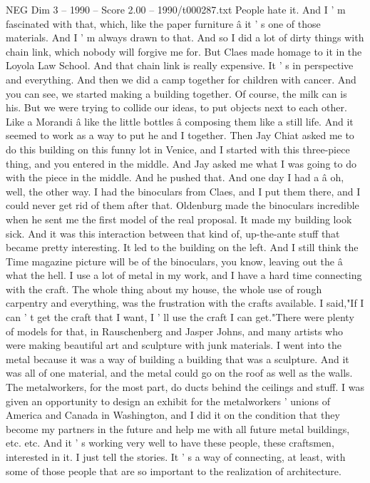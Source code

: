 \begin{textsample}{NEG Dim 3 – 1990 – Score 2.00 – 1990/t000287.txt}
People hate it.
And I ' m fascinated with that, which, like the paper furniture â it ' s one of those materials.
And I ' m always drawn to that.
And so I did a lot of dirty things with chain link, which nobody will forgive me for.
But Claes made homage to it in the Loyola Law School.
And that chain link is really expensive.
It ' s in perspective and everything.
And then we did a camp together for children with cancer.
And you can see, we started making a building together.
Of course, the milk can is his.
But we were trying to collide our ideas, to put objects next to each other.
Like a Morandi â like the little bottles â composing them like a still life.
And it seemed to work as a way to put he and I together.
Then Jay Chiat asked me to do this building on this funny lot in Venice, and I started with this three-piece thing, and you entered in the middle.
And Jay asked me what I was going to do with the piece in the middle.
And he pushed that.
And one day I had a â oh, well, the other way.
I had the binoculars from Claes, and I put them there, and I could never get rid of them after that.
Oldenburg made the binoculars incredible when he sent me the first model of the real proposal.
It made my building look sick.
And it was this interaction between that kind of, up-the-ante stuff that became pretty interesting.
It led to the building on the left.
And I still think the Time magazine picture will be of the binoculars, you know, leaving out the â what the hell.
I use a lot of metal in my work, and I have a hard time connecting with the craft.
The whole thing about my house, the whole use of rough carpentry and everything, was the frustration with the crafts available.
I said,"If I can ' t get the craft that I want, I ' ll use the craft I can get."There were plenty of models for that, in Rauschenberg and Jasper Johns, and many artists who were making beautiful art and sculpture with junk materials.
I went into the metal because it was a way of building a building that was a sculpture.
And it was all of one material, and the metal could go on the roof as well as the walls.
The metalworkers, for the most part, do ducts behind the ceilings and stuff.
I was given an opportunity to design an exhibit for the metalworkers ' unions of America and Canada in Washington, and I did it on the condition that they become my partners in the future and help me with all future metal buildings, etc. etc.
And it ' s working very well to have these people, these craftsmen, interested in it.
I just tell the stories.
It ' s a way of connecting, at least, with some of those people that are so important to the realization of architecture.

\end{textsample}
